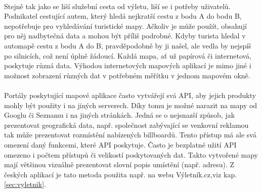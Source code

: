 \documentclass[11pt,a4paper,titlepage,oneside]{book}
\begin{document}
	\paragraph{} Stejně tak jako se liší služební cesta od výletu, liší se i potřeby uživatelů. Podnikatel cestující autem, který hledá nejkratší cestu z bodu A do bodu B, nepotřebuje pro vyhledávání turistické mapy. Ačkoliv je může použít, obsahují pro něj nadbytečná data a mohou být příliš podrobné. Kdyby turista hledal v automapě cestu z bodu A do B, pravděpodobně by ji našel, ale vedla by nejspíš po silnicích, což není úplně žádoucí. Každá mapa, ať už papírová či internetová, poskytuje různá data. Výhodou internetových mapových aplikací je mimo jiné i možnost zobrazení různých dat v potřebném měřítku v jednom mapovém okně.





	\paragraph{} Portály poskytující mapové aplikace často vytvářejí svá \ac{API}, aby jejich produkty mohly být použity i na jiných serverech. Díky tomu je možné narazit na mapy od Googlu či Seznamu i na jiných stránkách. Jedná se o nejsnazší způsob, jak prezentovat geografická data, např. společnost zabývající se venkovní reklamou tak může prezentovat rozmístění nabízených billboardů. Tento přístup má ale svá omezení daný funkcemi, které \ac{API} poskytuje. Často je bezplatné užití \ac{API} omezeno i počtem přístupů či velikostí poskytovaných dat. Takto vytvořené mapy mají většinou vizuálně prezentovat slovní popis umístění (např. adresu). Z českých aplikací je tato metoda použita např. na webu Výletník.cz,viz kap. \ref{sec:vyletnik}.
\end{document}
